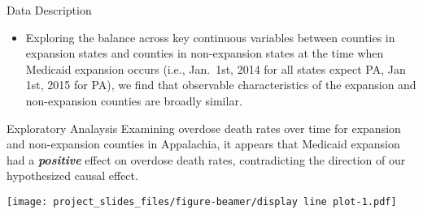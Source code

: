 \documentclass[
  ignorenonframetext,
]{beamer}
\providecommand{\tightlist}{%
  \setlength{\itemsep}{0pt}\setlength{\parskip}{0pt}}
\begin{document}
\begin{frame}{Data Description}
\protect\hypertarget{data-description-1}{}
\begin{itemize}
\tightlist
\item
  Exploring the balance across key continuous variables between counties
  in expansion states and counties in non-expansion states at the time
  when Medicaid expansion occurs (i.e., Jan.~1st, 2014 for all states
  expect PA, Jan 1st, 2015 for PA), we find that observable
  characteristics of the expansion and non-expansion counties are
  broadly similar.
\end{itemize}

\begin{table}

\caption{\label{tab:create diif in means}Difference-in-means during year of Medicaid expansion by county expansion status}
\centering
{}
\end{table}
\end{frame}

\begin{frame}{Exploratory Analaysis}
\protect\hypertarget{exploratory-analaysis}{}
Examining overdose death rates over time for expansion and non-expansion
counties in Appalachia, it appears that Medicaid expansion had a
\textbf{\emph{positive}} effect on overdose death rates, contradicting
the direction of our hypothesized causal effect.

\texttt{[image: project\_slides\_files/figure-beamer/display line plot-1.pdf]}
\end{frame}
\end{document}
